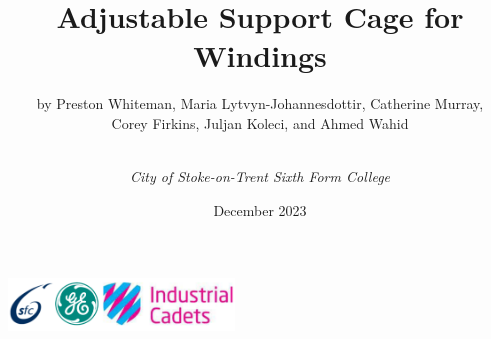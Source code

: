 \documentclass[a4paper,10pt]{article}
\title{\textbf{Adjustable Support Cage for Windings}}
\author{by Preston Whiteman, Maria Lytvyn-Johannesdottir, Catherine Murray, \\ Corey Firkins, Juljan Koleci, and Ahmed Wahid\and \\ \textit{City of Stoke-on-Trent Sixth Form College}}
\date{December 2023}
\begin{document}
\maketitle
\begin{center}
    \includegraphics[width = 6cm, height = 1.5cm]{Assets/logos.png}
\end{center}
\pagebreak
\end{document}
